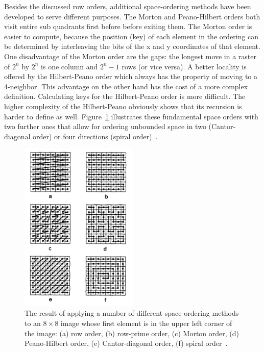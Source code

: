 Besides the discussed row orders, additional space-ordering methods have been developed to serve different purposes. The Morton and Peano-Hilbert orders both visit entire sub quadrants first before before exiting them. The Morton order is easier to compute, because the position (key) of each element in the ordering can be determined by interleaving the bits of the x and y coordinates of that element. One disadvantage of the Morton order are the gaps: the longest move in a raster of $2^n$ by $2^n$ is one column and $2^n - 1$ rows (or vice versa). A better locality is offered by the Hilbert-Peano order which always has the property of moving to a 4-neighbor. This advantage on the other hand has the cost of a more complex definition. Calculating keys for the Hilbert-Peano order is more difficult. The higher complexity of the Hilbert-Peano obviously shows that its recursion is harder to define as well. Figure~\ref{fig:space-orders} illustrates these fundamental space orders with two further ones that allow for ordering unbounded space in two (Cantor-diagonal order) or four directions (spiral order)~\cite{Samet90spatialdata}.

\begin{figure}[h]
  \begin{center}
    \includegraphics[width=0.5\textwidth]{figures/space_orders.png}
    \caption{The result of applying a number of different space-ordering methods to an $8 \times 8$ image whose first element is in the upper left corner of the image: (a) row order, (b) row-prime order, (c) Morton order, (d) Peano-Hilbert order, (e) Cantor-diagonal order, (f) spiral order~\cite[p 14]{Samet90spatialdata}.}
    \label{fig:space-orders}
  \end{center}
\end{figure}

